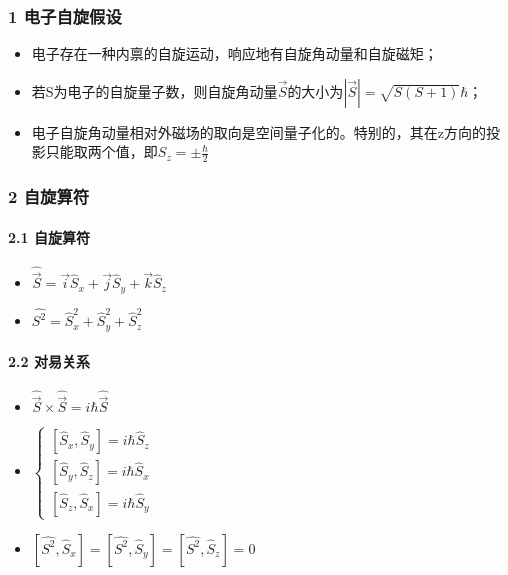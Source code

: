 \documentclass[UTF8,twocolumn]{ctexart}
\providecommand{\tightlist}{%
  \setlength{\itemsep}{0pt}\setlength{\parskip}{0pt}}
\let\oldparagraph\paragraph
\renewcommand{\paragraph}[1]{\oldparagraph{#1}\mbox{}}
\begin{document}
\hypertarget{ux7535ux5b50ux81eaux65cbux5047ux8bbe}{%
\subsubsection{1
电子自旋假设}\label{ux7535ux5b50ux81eaux65cbux5047ux8bbe}}

\begin{itemize}
\tightlist
\item
  电子存在一种内禀的自旋运动，响应地有自旋角动量和自旋磁矩；
\item
  若S为电子的自旋量子数，则自旋角动量\(\vec{S}\)的大小为\(|\vec{S}|=\sqrt{S(S+1)}\hbar\)；
\item
  电子自旋角动量相对外磁场的取向是空间量子化的。特别的，其在z方向的投影只能取两个值，即\(S_z=\pm\frac{\hbar}{2}\)
\end{itemize}

\hypertarget{ux81eaux65cbux7b97ux7b26}{%
\subsubsection{2 自旋算符}\label{ux81eaux65cbux7b97ux7b26}}

\hypertarget{ux81eaux65cbux7b97ux7b26-1}{%
\paragraph{ 2.1 自旋算符}\label{ux81eaux65cbux7b97ux7b26-1}}

\begin{itemize}
\tightlist
\item
  \(\hat{\vec{S}}=\vec{i}\hat{S}_x+\vec{j}\hat{S}_y+\vec{k}\hat{S}_z\)
\item
  \(\hat{S^2}=\hat{S}_x^2+\hat{S}_y^2+\hat{S}_z^2\)
\end{itemize}

\hypertarget{ux5bf9ux6613ux5173ux7cfb}{%
\paragraph{ 2.2 对易关系}\label{ux5bf9ux6613ux5173ux7cfb}}

\begin{itemize}
\tightlist
\item
  \(\hat{\vec{S}}\times\hat{\vec{S}}=i\hbar\hat{\vec{S}}\)
\item
  \(\begin{cases}
    [\hat{S}_x,\hat{S}_y]=i\hbar\hat{S}_z \\
    [\hat{S}_y,\hat{S}_z]=i\hbar\hat{S}_x \\
    [\hat{S}_z,\hat{S}_x]=i\hbar\hat{S}_y 
  \end{cases}\)
\item
  \([\hat{S^2},\hat{S}_x]=[\hat{S^2},\hat{S}_y]=[\hat{S^2},\hat{S}_z]=0\)
\end{itemize}
\end{document}
